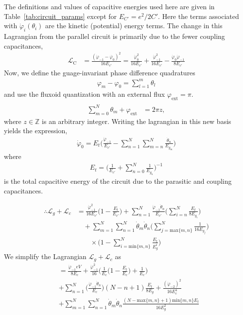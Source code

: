 \documentclass[%
reprint,
superscriptaddress,
 amsmath,amssymb,
 aps,
 prx,
longbibliography,
floatfix,
]{revtex4-2}
\begin{document}
The definitions and values of capacitive energies used here are given in Table~\ref{tab:circuit_params} except for $E_{C'}=e^2/2C'$. Here the terms associated with $\dot{\varphi}_i (\theta_i)$ are the kinetic (potential) energy terms. The change in this Lagrangian from the parallel circuit is primarily due to the fewer coupling capacitances,
\begin{align}
\mathcal{L}_{\textrm{C}}&=\frac{(\dot{\varphi}_{-1}-\dot{\varphi_0})^2}{16E_{c'}}=\frac{\dot{\varphi}^2_0}{16E_{c'}}+\frac{\dot{\varphi}^2_{-1}}{16E_{c'}}-\frac{\dot{\varphi}_0\dot{\varphi}_{-1}}{8E_{c'}}
\end{align}
Now, we define the guage-invariant phase difference quadratures 
\begin{align}
\varphi_m-\varphi_0=\sum_{l=1}^m\theta_l
\end{align}
and use the fluxoid quantization with an external flux $\varphi_{\mathrm{ext}}=\pi$.
\begin{align}
\\ \sum_{m=0}^N \theta_m+\varphi_\mathrm{ext}&=2\pi z,
\end{align}
where $z\in\mathbb{Z}$ is an arbitrary integer. Writing the lagrangian in this new basis yields the expression,
\begin{align}
    \dot{\varphi}_0=E_t\Big(\frac{\dot{\varphi}_{-1}}{E_{c'}}-\sum_{n=1}^N\sum_{m=n}^N\frac{\dot{\theta}_n}{E_{g_m}}\Big)
\end{align}
where 
\begin{align}
E_t=\Big(\frac{1}{E_{c'}}+\sum_{n=0}^N\frac{1}{E_{g_n}}\Big)^{-1}
\end{align}
is the total capacitive energy of the circuit due to the parasitic and coupling capacitances.

\begin{align}
\therefore     \mathcal{L}_g+\mathcal{L}_c&=\frac{\dot{\varphi}^2_{-1}}{16E_{c'}}\Big(1-\frac{E_t}{E_{c'}}\Big)+\sum_{n=1}^N\frac{\dot{\varphi}_{-1}\dot{\theta}_n}{E_{c'}}\Big(\sum_{i=n}^N\frac{E_t}{8E_{g_i}}\Big)\nonumber\\&\quad+\sum_{m=1}^N\sum_{n=1}^N\dot{\theta}_m\dot{\theta}_{n}\Big( \sum_{j=\text{max}\{m,n\}}^N\frac{1}{16E_{g_j}}\Big)\nonumber\\&\quad\quad
\times\Big(1-\sum_{i=\text{min}\{m,n\}}^N\frac{E_t}{E_g^i}\Big)
\end{align}
We simplify the Lagrangian $\mathcal{L}_g+\mathcal{L}_c$ as
\begin{align}
    &=\frac{\dot{\varphi}_{-1}eV}{8E_c}+\frac{\dot{\varphi}^2_{-1}}{16}\Big(\frac{1}{E_c}\Big(1-\frac{E_t}{E_c}\Big)+\frac{1}{E_c}\Big)\nonumber\\&+\sum_{n=1}^N\Big(\frac{\dot{\varphi}_{-1}\dot{\theta}_n}{E_c}\Big)(N-n+1)\frac{E_t}{8E_g}+\frac{(\dot{\varphi}_{-2})^2}{16E^4_{c}}\nonumber\\
&+\sum_{m=1}^N\sum_{n=1}^N\dot{\theta}_m\dot{\theta}_{n} \frac{(N-\text{max}\{m,n\}+1)\text{min}\{m,n\}E_t}{16E_g^2}
\end{align}
\end{document}
